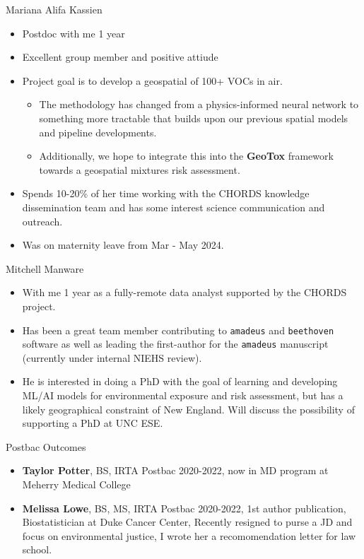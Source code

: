 \documentclass[
  ignorenonframetext,
]{beamer}
\providecommand{\tightlist}{%
  \setlength{\itemsep}{0pt}\setlength{\parskip}{0pt}}\usepackage{longtable,booktabs,array}
\begin{document}
\begin{frame}{Mariana Alifa Kassien}
\label{mariana-alifa-kassien}
\begin{itemize}
\tightlist
\item
  Postdoc with me 1 year
\item
  Excellent group member and positive attiude
\item
  Project goal is to develop a geospatial of 100+ VOCs in air.

  \begin{itemize}
  \tightlist
  \item
    The methodology has changed from a physics-informed neural network
    to something more tractable that builds upon our previous spatial
    models and pipeline developments.
  \item
    Additionally, we hope to integrate this into the \textbf{GeoTox}
    framework towards a geospatial mixtures risk assessment.
  \end{itemize}
\item
  Spends 10-20\% of her time working with the CHORDS knowledge
  dissemination team and has some interest science communication and
  outreach.
\item
  Was on maternity leave from Mar - May 2024.
\end{itemize}
\end{frame}

\begin{frame}[fragile]{Mitchell Manware}
\label{mitchell-manware}
\begin{itemize}
\tightlist
\item
  With me 1 year as a fully-remote data analyst supported by the CHORDS
  project.
\item
  Has been a great team member contributing to \texttt{amadeus} and
  \texttt{beethoven} software as well as leading the first-author for
  the \texttt{amadeus} manuscript (currently under internal NIEHS
  review).
\item
  He is interested in doing a PhD with the goal of learning and
  developing ML/AI models for environmental exposure and risk
  assessment, but has a likely geographical constraint of New England.
  Will discuss the possibility of supporting a PhD at UNC ESE.
\end{itemize}
\end{frame}

\begin{frame}{Postbac Outcomes}
\label{postbac-outcomes}
\begin{itemize}
\item
  \textbf{Taylor Potter}, BS, IRTA Postbac 2020-2022, now in MD program
  at Meherry Medical College
\item
  \textbf{Melissa Lowe}, BS, MS, IRTA Postbac 2020-2022, 1st author
  publication, Biostatistician at Duke Cancer Center, Recently resigned
  to purse a JD and focus on environmental justice, I wrote her a
  recomomendation letter for law school.
\end{itemize}
\end{frame}
\end{document}
